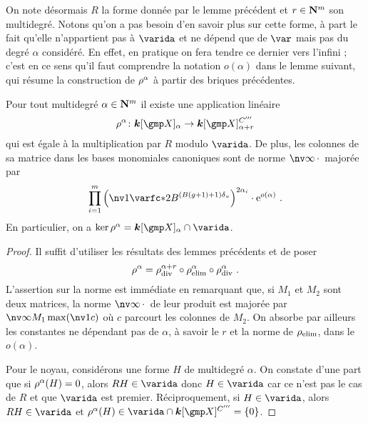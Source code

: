 On note désormais \( R \) la forme donnée par le lemme précédent et \( r \in
  {\mathbf{N}}^m \) son multidegré. Notons qu'on a pas besoin d'en savoir plus sur
cette forme, à part le fait qu'elle n'appartient pas à \( \varida \) et ne
dépend que de \( \var \) mais pas du degré \( \alpha \) considéré. En effet,
en pratique on fera tendre ce dernier vers l'infini ; c'est en ce sens qu'il
faut comprendre la notation \( o(\alpha) \) dans le lemme suivant, qui résume
la construction de \( \rho^\alpha \) à partir des briques précédentes.

\begin{lem} \label{l:rfull}
  Pour tout multidegré \( \alpha \in {\mathbf{N}}^m \) il existe une application
  linéaire
  \begin{equation}
    \rfull^\alpha \colon
    \cdn [\vmp]_ {\alpha}
    \to
    \cdn [\vmp]_ {\alpha+r}^{C'''}
  \end{equation}
  qui est égale à la multiplication par \( R \) modulo \( \varida \). De plus,
  les colonnes de sa matrice dans les bases monomiales canoniques sont de
  norme \( \nv\infty\truc \) majorée par
  \begin{equation}
    \prod\fctrange \left(
      \nv1{ \varfc* }
      2 B^{(B(g+1) + 1)\dv}
    \right) ^{ 2\alpha_\fct }
    \cdot \expb^{o(\alpha)}
    \pmm.
  \end{equation}
  En particulier, on a \( \ker \rfull^\alpha = \cdn[ \vmp ]_\alpha \cap
    \varida \).
\end{lem}

\begin{proof}
  Il suffit d'utiliser les résultats des lemmes précédents et de poser
  \begin{equation}
    \rho^\alpha
    =
    \rho\sb{\mathrm{div }}^{\alpha+r} \circ \rho\sb{\mathrm{elim}}^{\alpha} \circ \rho\sb{\mathrm{div }}^\alpha
    \text{ .}
  \end{equation}
  L'assertion sur la norme est immédiate en remarquant que, si \( M_1 \) et \(
    M_2 \) sont deux matrices, la norme \( \nv\infty\truc \) de leur produit
  est majorée par \( \nv\infty{M_1} \max(\nv1{c}) \) où \( c \) parcourt les
  colonnes de \( M_2 \). On absorbe par ailleurs les constantes ne dépendant
  pas de \( \alpha \), à savoir le \( r \) et la norme de \( \rho\sb{\mathrm{elim}} \), dans
  le \( o(\alpha) \).

  Pour le noyau, considérons une forme \( H \) de multidegré \( \alpha \). On
  constate d'une part que si \( \rho^\alpha(H) = 0 \), alors \( R H \in
    \varida \) donc \( H \in \varida \) car ce n'est pas le cas de \( R \) et
  que \( \varida \) est premier. Réciproquement, si \( H \in \varida \), alors
  \( RH \in \varida \) et \( \rfull^\alpha(H) \in \varida \cap \cdn[ \vmp
    ]^{C'''} = \set0 \).
\end{proof}

